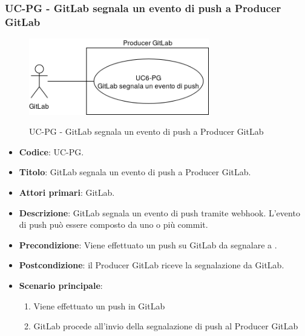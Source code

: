 \subsubsection{UC\theuccount-PG - GitLab segnala un evento di push a Producer GitLab}
	\begin{figure}[H]
		\centering
		\includegraphics[width=0.7\textwidth]{img/casi_d'uso/UC6.png}\\
		\caption{UC\theuccount-PG - GitLab segnala un evento di push a Producer GitLab}
	\end{figure}
	\begin{itemize}
		\item \textbf{Codice}: UC\theuccount-PG.
		\item \textbf{Titolo}: GitLab segnala un evento di push a Producer GitLab.
		\item \textbf{Attori primari}: GitLab.
		\item \textbf{Descrizione}: GitLab segnala un evento di push tramite webhook. L'evento di	push può essere composto da uno o più commit.
		\item \textbf{Precondizione}: Viene effettuato un push su GitLab da segnalare a \progetto.
		\item \textbf{Postcondizione}: il Producer GitLab riceve la segnalazione da GitLab.
		\item \textbf{Scenario principale}: 
		\begin{enumerate}
			\item Viene effettuato un push in GitLab
			\item GitLab procede all'invio della segnalazione di push al Producer GitLab
		\end{enumerate}
		
	\end{itemize}